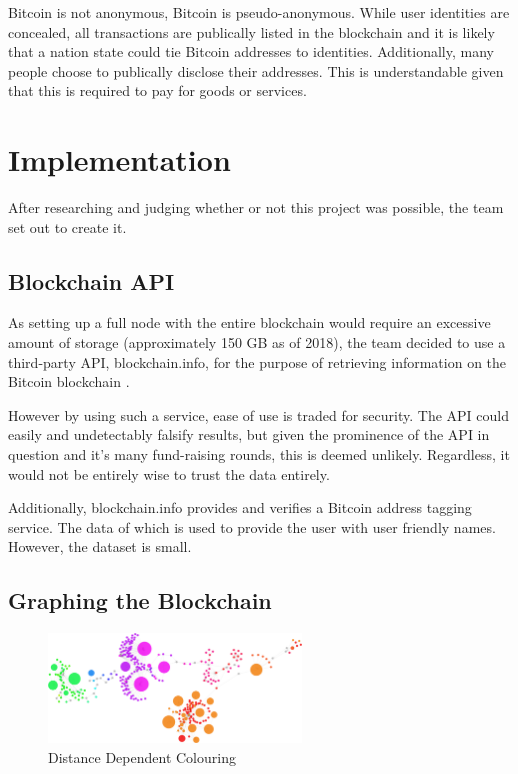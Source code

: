 \documentclass{article}
\begin{document}
Bitcoin is not anonymous, Bitcoin is pseudo-anonymous. While user identities are concealed, all transactions are publically listed in the blockchain and it is likely that a nation state could tie Bitcoin addresses to identities. Additionally, many people choose to publically disclose their addresses. This is understandable given that this is required to pay for goods or services.

\section{Implementation}

After researching and judging whether or not this project was possible, the team set out to create it.

\subsection{Blockchain API}

As setting up a full node with the entire blockchain would require an excessive amount of storage (approximately 150 GB as of 2018), the team decided to use a third-party API, blockchain.info, for the purpose of retrieving information on the Bitcoin blockchain \cite{blockchain_2018_open}.

However by using such a service, ease of use is traded for security. The API could easily and undetectably falsify results, but given the prominence of the API in question and it's many fund-raising rounds, this is deemed unlikely. Regardless, it would not be entirely wise to trust the data entirely.

Additionally, blockchain.info provides and verifies a Bitcoin address tagging service. The data of which is used to provide the user with user friendly names. However, the dataset is small.

\subsection{Graphing the Blockchain}

\begin{figure}[H]
  \centering
  \includegraphics[width=0.6\textwidth]{images/distance.png}
  \caption{Distance Dependent Colouring}
  \label{fig:distancecolouring}
\end{figure}
\end{document}
